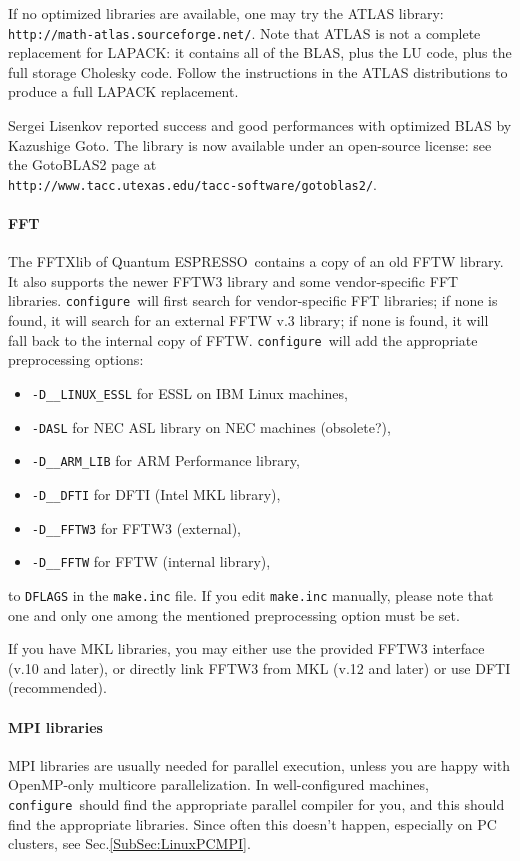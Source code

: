 \documentclass[12pt,a4paper]{article}
\def\qe{{\sc Quantum ESPRESSO}}
\def\configure{\texttt{configure}}
\begin{document}
If no optimized libraries are available, one may try the ATLAS library:
\texttt{http://math-atlas.sourceforge.net/}. Note that ATLAS is not
a complete replacement for LAPACK: it contains all of the BLAS, plus the
LU code, plus the full storage Cholesky code. Follow the instructions in the
ATLAS distributions to produce a full LAPACK replacement.

Sergei Lisenkov reported success and good performances with optimized
BLAS by Kazushige Goto. The library is now available under an
open-source license: see the GotoBLAS2 page at \\
\texttt{http://www.tacc.utexas.edu/tacc-software/gotoblas2/}.

\paragraph{FFT}
The FFTXlib of \qe\ contains a copy of an old FFTW library.
It also supports
the newer FFTW3 library and some vendor-specific FFT libraries.
\configure\ will first search for vendor-specific FFT libraries;
if none is found, it will search for an external FFTW v.3 library;
if none is found, it will fall back to the internal  copy of FFTW.
\configure\ will add the appropriate preprocessing options:
\begin{itemize}
\item \texttt{-D\_\_LINUX\_ESSL} for ESSL on IBM Linux machines,
\item \texttt{-DASL} for NEC ASL library on NEC machines (obsolete?),
\item \texttt{-D\_\_ARM\_LIB} for ARM Performance library,
\item \texttt{-D\_\_DFTI}  for DFTI (Intel MKL library),
\item \texttt{-D\_\_FFTW3} for FFTW3 (external),
\item \texttt{-D\_\_FFTW}  for FFTW (internal library),
\end{itemize}
to \texttt{DFLAGS} in the \texttt{make.inc} file.
If you edit \texttt{make.inc} manually, please note that one and
only one among the mentioned preprocessing option must be set.

If you have MKL libraries, you may either use the provided FFTW3
interface (v.10 and later), or directly link FFTW3 from MKL (v.12
and later) or use DFTI (recommended).

\paragraph{MPI libraries}
MPI libraries are usually needed for parallel execution, unless you are 
happy with OpenMP-only multicore parallelization.
In well-configured machines, \configure\ should find the appropriate
parallel compiler for you, and this should find the appropriate
libraries. Since often this doesn't
happen, especially on PC clusters, see Sec.\ref{SubSec:LinuxPCMPI}.
\end{document}
